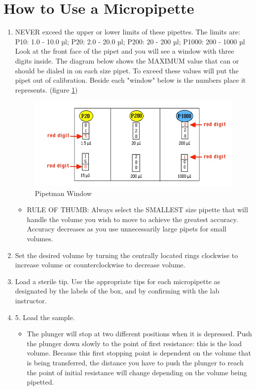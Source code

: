 \documentclass[12pt]{../SOP3_alpha}
\begin{document}
\section {How to Use a Micropipette}
\begin{enumerate}
  \item NEVER exceed the upper or lower limits of these pipettes.
The limits are:  P10: 1.0 - 10.0 µl; P20: 2.0 - 20.0 µl; P200: 20 - 200 µl; P1000: 200 - 1000 µl  
Look at the front face of the pipet and you will see a window with three digits inside. The diagram below shows the MAXIMUM value that can or should be dialed in on each size pipet. To exceed these values will put the pipet out of calibration. Beside each "window" below is the numbers place it represents. (figure \ref{fig:pipetman})
\begin{figure} [H!]
\caption{Pipetman Window}
\label{fig:pipetman}
\includegraphics{pipetman2.jpg}
\end{figure}
\begin{itemize}
  \item RULE OF THUMB: Always select the SMALLEST size pipette that will handle the volume you wish to move to achieve the greatest accuracy. Accuracy decreases as you use unnecessarily large pipets for small volumes.   
\end{itemize}
\item Set the desired volume by turning the centrally located rings clockwise to increase volume or counterclockwise to decrease volume.  
\item Load a sterile tip. Use the appropriate tips for each micropipette as designated by the labels of the box, and by confirming with the lab instructor. 
\item 5.	 Load the sample. 
\begin{itemize}
  \item The plunger will stop at two different positions when it is depressed. Push the plunger down slowly to the point of first resistance: this is the load volume. Because this first stopping point is dependent on the volume that is being transferred, the distance you have to push the plunger to reach the point of initial resistance will change depending on the volume being pipetted. 

\end{itemize}
\end{enumerate}
\end{document}
